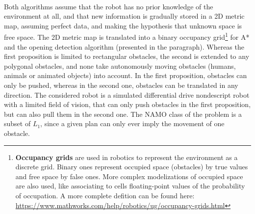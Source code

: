 \paragraph{} Both algorithms assume that the robot has no prior knowledge of the environment at all, and that new information is gradually stored in a 2D metric map, assuming perfect data, and making the hypothesis that unknown space is free space. The 2D metric map is translated into a binary occupancy grid\footnote{\textbf{Occupancy grids} are used in robotics to represent the environment as a discrete grid. Binary ones represent occupied space (obstacles) by true values and free space by false ones. More complex modelizations of occupied space are also used, like associating to cells floating-point values of the probability of occupation. A more complete defition can be found here: \url{https://www.mathworks.com/help/robotics/ug/occupancy-grids.html}} for A* and the opening detection algorithm (presented in the  paragraph). Whereas the first proposition is limited to rectangular obstacles, the second is extended to any polygonal obstacles, and none take autonomously moving obstacles (humans, animals or animated objects) into account. In the first proposition, obstacles can only be pushed, whereas in the second one, obstacles can be translated in any direction. The considered robot is a simulated differential drive nondescript robot with a limited field of vision, that can only push obstacles in the first proposition, but can also pull them in the second one. The NAMO class of the problem is a subset of $L_1$, since a given plan can only ever imply the movement of one obstacle.

